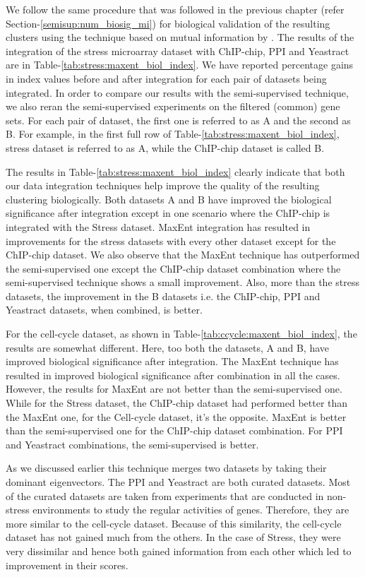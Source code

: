 We follow the same procedure that was followed in the previous chapter (refer Section-\ref{semisup:num_biosig_mi}) for biological validation of the resulting clusters using the technique based on 
mutual information by \citet{Gibons2002Judging}. The results of the integration of the stress microarray dataset with ChIP-chip, PPI and Yeastract are in 
Table-\ref{tab:stress:maxent_biol_index}. We have reported percentage gains in index values before and after 
integration for each pair of datasets being integrated. In order to compare our 
results with the semi-supervised technique, we also reran the semi-supervised experiments on the filtered (common) gene sets. For each pair of dataset, the first one is referred 
to as A and the second as B. For example, in the first full row of Table-\ref{tab:stress:maxent_biol_index}, 
stress dataset is referred to as A, while the ChIP-chip dataset is called B. 

The results in Table-\ref{tab:stress:maxent_biol_index} clearly indicate that both our data integration techniques 
help improve the quality of the resulting clustering biologically. Both datasets A and B have improved the 
biological significance after integration except in one scenario where the ChIP-chip is integrated with the Stress dataset. MaxEnt 
integration has resulted in improvements for the stress datasets with every other dataset except for the 
ChIP-chip dataset. We also observe that the MaxEnt technique has outperformed 
the semi-supervised one except the ChIP-chip dataset combination where the semi-supervised technique shows a 
small improvement. Also, more than the stress datasets, the improvement in the B datasets i.e. the ChIP-chip, PPI and Yeastract datasets, when combined, is better. 

For the cell-cycle dataset, as shown in Table-\ref{tab:ccycle:maxent_biol_index}, the results are somewhat different. Here, too both the datasets, A and B, have improved biological 
significance after integration. The MaxEnt technique has resulted in improved biological significance
after combination in all the cases. However, the results for MaxEnt are not better than the semi-supervised one. 
While for the Stress dataset, the ChIP-chip dataset had performed 
better than the MaxEnt one, for the Cell-cycle dataset, it's the opposite. MaxEnt is better than the semi-supervised one for the ChIP-chip dataset combination. 
For PPI and Yeastract combinations, the semi-supervised is better.
 
As we discussed earlier this technique merges two datasets by taking their dominant eigenvectors. The PPI and Yeastract 
are both curated datasets. Most of the curated datasets are taken from experiments that are conducted in non-stress environments to study the regular activities of genes. 
Therefore, they are more similar to the cell-cycle dataset. Because of this similarity, the cell-cycle dataset has not gained much from the others. 
In the case of Stress, they were very dissimilar and hence both gained information from each other which led to improvement in their scores.    

